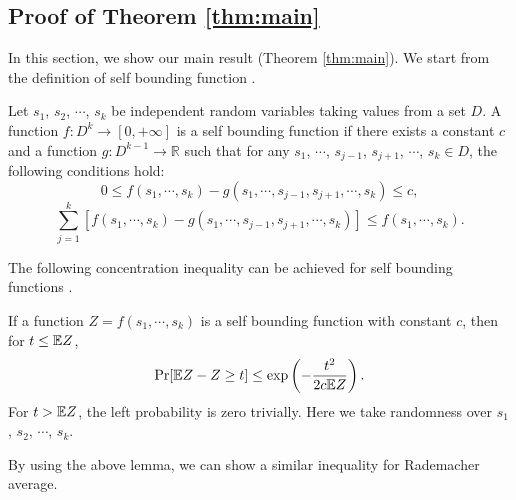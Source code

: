 \subsection{Proof of Theorem \ref{thm:main}}
In this section, we show our main result (Theorem \ref{thm:main}).
We start from the definition of self bounding function \cite{Oneto13}.
\begin{definition}
Let $s_1$, $s_2$, $\cdots$, $s_k$ be independent random variables taking values from a set $D$. A function $f: D^k \to [0, +\infty]$ is a self bounding function if there exists a constant $c$ and a function $g: D^{k-1}\to \mathbb{R}$ such that for any $s_1$, $\cdots$, $s_{j-1}$, $s_{j+1}$, $\cdots$, $s_k \in D$, the following conditions hold:
$$0 \leq f(s_1, \cdots, s_k) - g(s_1,\cdots, s_{j-1}, s_{j+1}, \cdots, s_k) \leq c,$$
$$\sum_{j=1}^k [f(s_1, \cdots, s_k) - g(s_1,\cdots, s_{j-1}, s_{j+1}, \cdots, s_k)] \leq f(s_1, \cdots, s_k).$$
\end{definition}

The following concentration inequality can be achieved for self bounding functions \cite{BLM99}.

\begin{lemma}
\cite{BLM99} If a function $Z = f(s_1,\cdots,s_k)$ is a self bounding function with constant $c$, then for $t \leq \mathbb{E} Z$,
$$\Pr[\mathbb{E} Z - Z \geq t] \leq \exp\left(-\frac{t^2}{2c\mathbb{E} Z}\right).$$
For $t > \mathbb{E} Z$, the left probability is zero trivially.
Here we take randomness over $s_1$, $s_2$, $\cdots$, $s_k$.
\end{lemma}

By using the above lemma, we can show a similar inequality for Rademacher average. 

